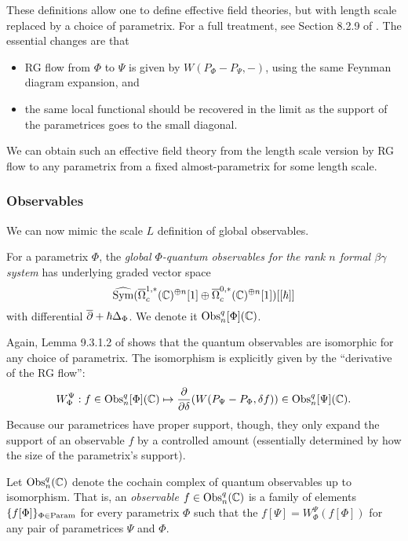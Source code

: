 These definitions allow one to define effective field theories, but with length scale replaced by a choice of parametrix.
For a full treatment, see Section 8.2.9 of \cite{CG2}.
The essential changes are that 
\begin{itemize}
\item RG flow from $\Phi$ to $\Psi$ is given by $W(P_\Phi - P_\Psi,-)$, using the same Feynman diagram expansion, and
\item the same local functional should be recovered in the limit as the support of the parametrices goes to the small diagonal.
\end{itemize} 
We can obtain such an effective field theory from the length scale version 
by RG flow to any parametrix from a fixed almost-parametrix for some length scale.

\subsubsection{Observables}

We can now mimic the scale $L$ definition of global observables.

\begin{dfn}
For a parametrix $\Phi$, the  \emph{global $\Phi$-quantum observables for the rank $n$ formal $\beta\gamma$ system} has
underlying graded vector space
\[
\widehat{{\rm Sym}}(\overline{\Omega}_c^{1,*}(\mathbb C)^{\oplus n}[1] \oplus \overline{\Omega}^{0,*}_c(\mathbb C)^{\oplus n}[1])[[\hbar]]
\]
with differential $\overline{\partial} + \hbar \Delta_\Phi$. 
We denote it ${\rm Obs}^q_n[\Phi](\mathbb C)$.
\end{dfn}

Again, Lemma 9.3.1.2 of \cite{CG2} shows that the quantum observables are isomorphic for any choice of parametrix.
The isomorphism is explicitly given by the ``derivative of the RG flow'':
\[
W_\Phi^\Psi: f \in {\rm Obs}^q_n[\Phi](\mathbb C) \mapsto \frac{\partial}{\partial \delta}(W(P_\Psi - P_\Phi, \delta f)) \in {\rm Obs}^q_n[\Psi](\mathbb C).
\]
Because our parametrices have proper support, though, they only expand the support of an observable $f$ by a controlled amount 
(essentially determined by how the size of the parametrix's support).

\begin{dfn}
Let ${\rm Obs}^q_n(\mathbb C)$ denote the cochain complex of quantum observables up to isomorphism.
That is, an \emph{observable} $f \in {\rm Obs}^q_n(\mathbb C)$ is a family of elements $\{f[\Phi]\}_{\Phi \in {\rm Param}}$ for every parametrix $\Phi$ 
such that the $f[\Psi] = W_\Phi^\Psi(f[\Phi])$ for any pair of parametrices $\Psi$ and $\Phi$.
\end{dfn}

